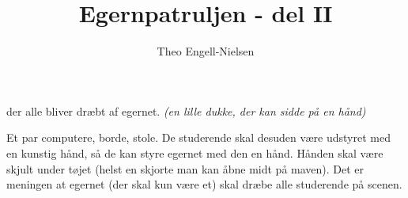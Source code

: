 \documentclass{article}
\begin{document}
\title{Egernpatruljen - del I$\!$I}
\author{Theo Engell-Nielsen}


\maketitle

\begin{roles}
 der alle bliver dræbt af egernet.
 \em{(en lille dukke, der kan sidde på en hånd)}
\end{roles}
\begin{props}
\prop{} Et par computere, borde, stole.
        De studerende skal desuden være udstyret med en kunstig hånd, så
        de kan styre egernet med den en hånd. Hånden skal være skjult under
        tøjet (helst en skjorte man kan åbne midt på maven). Det er meningen
        at egernet (der skal kun være et) skal dræbe alle studerende på
        scenen.
\end{props}
\end{document}
